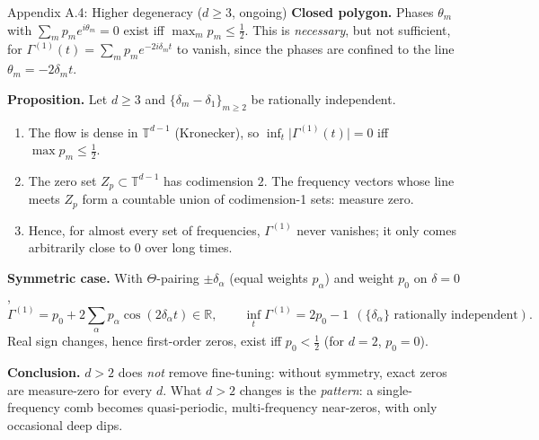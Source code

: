 \documentclass[aspectratio=169,11pt]{beamer}
\begin{document}
\begin{frame}{Appendix A.4: Higher degeneracy ($d\ge3$, ongoing)}
\footnotesize
\textbf{Closed polygon.} Phases $\theta_m$ with $\sum_mp_me^{i\theta_m}=0$ exist iff $\max_mp_m\le\tfrac12$. This is \emph{necessary}, but not sufficient, for $\Gamma^{(1)}(t)=\sum_mp_me^{-2i\delta_mt}$ to vanish, since the phases are confined to the line $\theta_m=-2\delta_mt$.
\medskip

\textbf{Proposition.} Let $d\ge3$ and $\{\delta_m-\delta_1\}_{m\ge2}$ be rationally independent.
\begin{enumerate}\setlength\itemsep{2pt}
\item The flow is dense in $\mathbb T^{d-1}$ (Kronecker), so $\inf_t\lvert\Gamma^{(1)}(t)\rvert=0$ iff $\max p_m\le\tfrac12$.
\item The zero set $Z_p\subset\mathbb T^{d-1}$ has codimension $2$. The frequency vectors whose line meets $Z_p$ form a countable union of codimension-1 sets: measure zero.
\item Hence, for almost every set of frequencies, $\Gamma^{(1)}$ never vanishes; it only comes arbitrarily close to $0$ over long times.
\end{enumerate}
\medskip
\textbf{Symmetric case.} With $\Theta$-pairing $\pm\delta_\alpha$ (equal weights $p_\alpha$) and weight $p_0$ on $\delta=0$,
\[
\Gamma^{(1)}=p_0+2\sum_\alpha p_\alpha\cos(2\delta_\alpha t)\in\mathbb R,\qquad \inf_t\Gamma^{(1)}=2p_0-1\ \ (\{\delta_\alpha\}\text{ rationally independent}).
\]
Real sign changes, hence first-order zeros, exist iff $p_0<\tfrac12$ (for $d=2$, $p_0=0$).
\medskip

\textbf{Conclusion.} $d>2$ does \emph{not} remove fine-tuning: without symmetry, exact zeros are measure-zero for every $d$. What $d>2$ changes is the \emph{pattern}: a single-frequency comb becomes quasi-periodic, multi-frequency near-zeros, with only occasional deep dips.
\end{frame}
\end{document}
